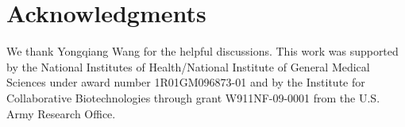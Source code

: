 \documentclass[11pt, letterpaper]{article}
\providecommand{\DIFaddbegin}{} %
\providecommand{\DIFaddend}{} %
\begin{document}
\section*{Acknowledgments}
We thank Yongqiang Wang for the helpful discussions.
This work was supported by the National Institutes of Health/National Institute of General Medical Sciences under award number 1R01GM096873-01 and by the Institute for Collaborative Biotechnologies through grant W911NF-09-0001 from the U.S.
Army Research Office.


\DIFaddbegin 

\DIFaddend 
\end{document}
